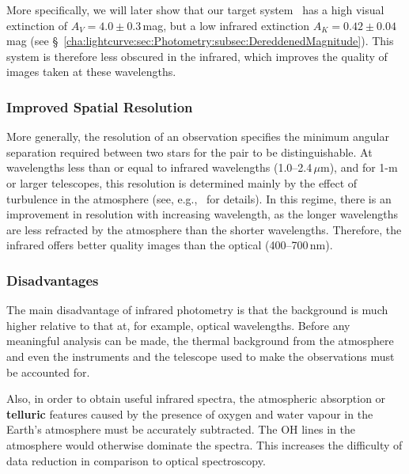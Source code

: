\vspace{\myparskip}

More specifically, we will later show that our target system \groj\ has a high visual extinction of $A_{V} =4.0\pm0.3$\,mag, but a low infrared extinction $A_{K} = 0.42\pm0.04$\,mag (see \S~\vref{cha:lightcurve:sec:Photometry:subsec:DereddenedMagnitude}). This system is therefore
less obscured in the infrared, which improves the quality of images taken at these wavelengths. %


\subsubsection{Improved Spatial Resolution}\label{cha:InfraredDataReductionTechniques:sec:InfraredAstronomy:subsubsec:ImprovedResolution}

More generally, the resolution of an observation specifies the minimum angular
separation required between two stars for the pair to be
distinguishable. At wavelengths less than or equal to infrared wavelengths
(1.0--2.4$\,\mu \mathrm{m}$), and for 1-m or larger telescopes, this
resolution is determined mainly by the effect of turbulence in the
atmosphere (see, e.g., %
%
\ for details). In this regime, there is an improvement in resolution
with increasing wavelength, as the longer wavelengths are less
refracted by the atmosphere than the shorter wavelengths. Therefore,
the infrared offers better quality images than the optical
(400--700\,nm). %


\subsubsection{Disadvantages}\label{cha:InfraredDataReductionTechniques:sec:InfraredAstronomy:subsubsec:Disadvantages}

The main disadvantage of infrared photometry is that the background
is much higher relative to that at, for example, optical
wavelengths. Before any meaningful analysis can be made, the thermal
background from the atmosphere and even the instruments and the telescope used to
make the observations must be accounted for.

\vspace{\myparskip}

Also, in order to obtain useful infrared spectra, the
atmospheric absorption or \textbf{telluric} features caused by the presence of oxygen and water vapour in the
Earth's atmosphere must be accurately subtracted. The OH lines in the
atmosphere would otherwise dominate the spectra. This increases the
difficulty of data reduction in comparison to optical spectroscopy. %

